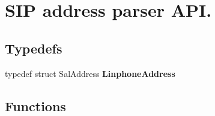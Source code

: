 \section{S\-I\-P address parser A\-P\-I.}
\label{group__linphone__address}
\subsection*{Typedefs}
\begin{DoxyCompactItemize}
\item 
typedef struct Sal\-Address {\bf Linphone\-Address}
\end{DoxyCompactItemize}
\subsection*{Functions}
